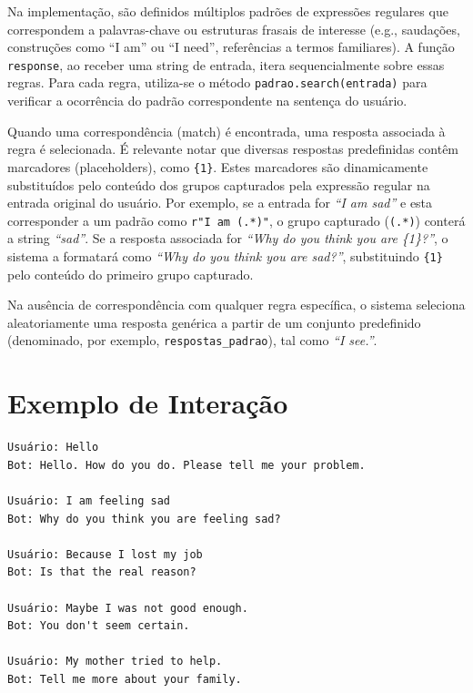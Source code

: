 \documentclass[14pt,a4paper,oneside]{book}
\begin{document}
Na implementação, são definidos múltiplos padrões de expressões regulares que correspondem a palavras-chave ou estruturas frasais de interesse (e.g., saudações, construções como ``I am'' ou ``I need'', referências a termos familiares). A função \texttt{response}, ao receber uma string de entrada, itera sequencialmente sobre essas regras. Para cada regra, utiliza-se o método \texttt{padrao.search(entrada)} para verificar a ocorrência do padrão correspondente na sentença do usuário.

Quando uma correspondência (match) é encontrada, uma resposta associada à regra é selecionada. É relevante notar que diversas respostas predefinidas contêm marcadores (placeholders), como \texttt{\{1\}}. Estes marcadores são dinamicamente substituídos pelo conteúdo dos grupos capturados pela expressão regular na entrada original do usuário. Por exemplo, se a entrada for \textit{``I am sad''} e esta corresponder a um padrão como \texttt{r"I am (.*)"}, o grupo capturado (\texttt{(.*)}) conterá a string \textit{``sad''}. Se a resposta associada for \textit{``Why do you think you are \{1\}?''}, o sistema a formatará como \textit{``Why do you think you are sad?''}, substituindo \texttt{\{1\}} pelo conteúdo do primeiro grupo capturado.

Na ausência de correspondência com qualquer regra específica, o sistema seleciona aleatoriamente uma resposta genérica a partir de um conjunto predefinido (denominado, por exemplo, \texttt{respostas\_padrao}), tal como \textit{``I see.''}.

\section{Exemplo de Interação}

\begin{verbatim}
Usuário: Hello
Bot: Hello. How do you do. Please tell me your problem.

Usuário: I am feeling sad
Bot: Why do you think you are feeling sad?

Usuário: Because I lost my job
Bot: Is that the real reason?

Usuário: Maybe I was not good enough.
Bot: You don't seem certain.

Usuário: My mother tried to help.
Bot: Tell me more about your family.
\end{verbatim}
\end{document}
